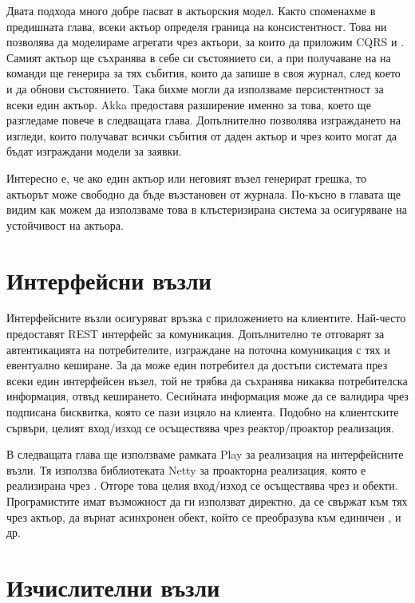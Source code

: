 Двата подхода много добре пасват в актьорския модел. Както споменахме в предишната глава, всеки актьор определя граница на консистентност. Това ни позволява да моделираме агрегати чрез актьори, за които да приложим CQRS и . Самият актьор ще съхранява в себе си състоянието си, а при получаване на на команди ще генерира за тях събития, които да запише в своя журнал, след което и да обнови състоянието. Така бихме могли да използваме персистентност за всеки един актьор. Akka предоставя разширение именно за това, което ще разгледаме повече в следващата глава. Допълнително позволява изграждането на изгледи, които получават всички събития от даден актьор и чрез които могат да бъдат изграждани модели за заявки.

Интересно е, че ако един актьор или неговият възел генерират грешка, то актьорът може свободно да бъде възстановен от журнала. По-късно в главата ще видим как можем да използваме това в клъстеризирана система за осигуряване на устойчивост на актьора.

\section{Интерфейсни възли}

Интерфейсните възли осигуряват връзка с приложението на клиентите. Най-често предоставят REST интерфейс за комуникация. Допълнително те отговарят за автентикацията на потребителите, изграждане на поточна комуникация с тях и евентуално кеширане. За да може един потребител да достъпи системата през всеки един интерфейсен възел, той не трябва да съхранява никаква потребителска информация, отвъд кеширането. Сесийната информация може да се валидира чрез подписана бисквитка, която се пази изцяло на клиента. Подобно на клиентските сървъри, целият вход/изход се осъществява чрез реактор/проактор реализация.

В следващата глава ще използваме рамката Play за реализация на интерфейсните възли. Тя използва библиотеката Netty за проакторна реализация, която е реализирана чрез . Отгоре това целия вход/изход се осъществява чрез  и  обекти. Програмистите имат възможност да ги използват директно, да се свържат към тях чрез актьор, да върнат асинхронен  обект, който се преобразува към единичен , и др.

\section{Изчислителни възли}

